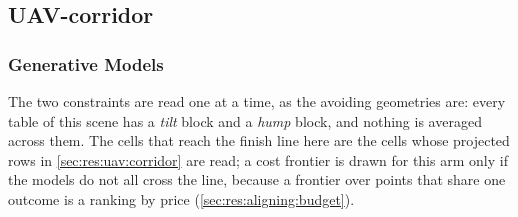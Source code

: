 \subsection{UAV-corridor}\label{sec:res:uav:corridor}

\subsubsection{Generative Models}\label{sec:res:uav:corridor:raw}
The two constraints are read one at a time, as the avoiding geometries are: every table of this scene has a
\emph{tilt} block and a \emph{hump} block, and nothing is averaged across them.
 The cells that reach the finish line here are the cells whose projected
rows in \autoref{sec:res:uav:corridor} are read; a cost frontier is drawn for this arm only if the models
do not all cross the line, because a frontier over points that share one outcome is a ranking by price
(\autoref{sec:res:aligning:budget}).

